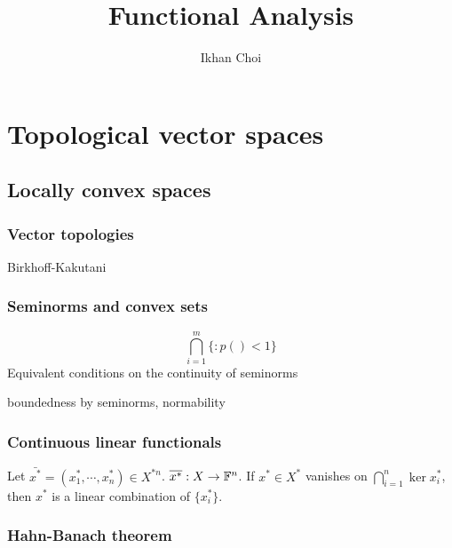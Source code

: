 \documentclass{../../large}
\begin{document}
\title{Functional Analysis}
\author{Ikhan Choi}
\maketitle
\tableofcontents

\part{Topological vector spaces}


\chapter{Locally convex spaces}
\section{Vector topologies}

\begin{prb}
\end{prb}
\begin{prb}[Metrizability]
Birkhoff-Kakutani
\end{prb}
\begin{prb}
\end{prb}

\section{Seminorms and convex sets}
\begin{prb}[Seminorms]
\[\bigcap_{i=1}^m\{:p()<1\}\]
Equivalent conditions on the continuity of seminorms
\end{prb}
\begin{pf}
\end{pf}
boundedness by seminorms, normability

\section{Continuous linear functionals}
\begin{prb}
Let $\bar{x^*}=(x_1^*,\cdots,x_n^*)\in X^{*n}$.
$\overline{x^*}:X\to\mathbb{F}^n$.
If $x^*\in X^*$ vanishes on $\bigcap_{i=1}^n\ker x_i^*$, then $x^*$ is a linear combination of $\{x_i^*\}$.
\end{prb}



\section{Hahn-Banach theorem}
\end{document}
